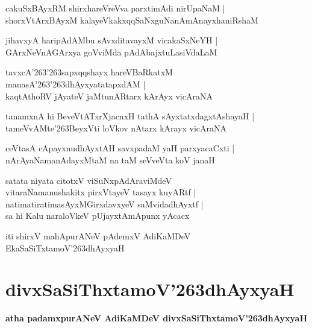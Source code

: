 \documentclass[twoside,12pt,openright]{book}
\def\S{\char'263}
\newcounter{shloka}[chapter]
\begin{document}
\begin{shloka}
cakuSxBAyxRM shirxhareVreVva parxtimAdi nirUpaNaM |\\
shorxVtArxBAyxM kalayeVkakxqqSaNxguNanAmAnayxhaniRshaM 
\end{shloka}

\begin{shloka}
jihavxyA haripAdAMbu sAvxditavayxM  vicakaSxNeYH |\\
GArxNeVnAGArxya goVviMda pAdAbajxtuLasiVdaLaM 
\end{shloka}

\begin{shloka}
tavxcA\S\S sapxqqshayx hareVBaRkatxM manasA\S\S dhAyxyatatapxdAM |\\
kaqtAthoRV jAyateV jaMtunARtarx kArAyx vicAraNA
\end{shloka}

\begin{shloka}
tanamxnA hi BeveVtATxrXjacnxH tathA sAyxtatxdagxtAshayaH |\\
tameVvAMte\S BeyxVti loVkov nAtarx kArayx vicAraNA 
\end{shloka}

\begin{shloka}
ceVtasA cApayxnudhAyxtAH savxpadaM yaH parxyacaCxti |\\
nArAyaNamanAdayxMtaM na taM seVveVta koV janaH 
\end{shloka}

\begin{shloka}
satata niyata citotxV viSuNxpAdAraviMdeV \\
vitaraNamanushakitx pirxVtayeV tasayx kuyARtf |\\
natimatiratimasAyxMGirxdavxyeV saMvidadhAyxtf |\\
sa hi Kalu naraloVkeV pUjayxtAmApunx yAcacx
\end{shloka}

\begin{center}
iti shirxV mahApurANeV pAdemxV AdiKaMDeV EkaSaSiTxtamoV\S dhAyxyaH 
\end{center}

\chapter{divxSaSiThxtamoV\S dhAyxyaH}

\begin{center}
{\LARGE\bfseries atha padamxpurANeV AdiKaMDeV divxSaSiThxtamoV\S dhAyxyaH}
\end{center}
\end{document}
